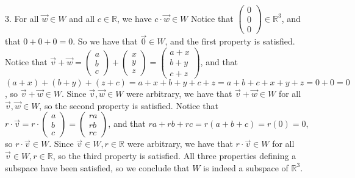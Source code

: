\documentclass[12pt]{article}
\newenvironment{problem}[2][Problem]
{
	\begin{trivlist} 
		\item[\hskip \labelsep {\bfseries #1 #2:}]
	}
{
	\end{trivlist}
	}
\newenvironment{solution}[1][Solution]
{
	\begin{trivlist} 
		\item[\hskip \labelsep {\itshape #1:}]
	}
	{
	\end{trivlist}
}
\begin{document}
\begin{problem}{5}
\begin{solution}
3. For all $\vec{w} \in W$ and all $c \in \mathbb{R}$, we have $c\cdot \vec{w} \in W$
\newline
\newline
\noindent
Notice that $\begin{pmatrix} 0\\0\\0 \end{pmatrix} \in \mathbb{R}^3$, and that $0+0+0 =0$. So we have that $\vec{0}\in W$, and the first property is satisfied.
\newline
\newline
\noindent
Notice that $\vec{v} +\vec{w} = \begin{pmatrix} a\\b\\c \end{pmatrix} + \begin{pmatrix}x\\y\\z\end{pmatrix} = \begin{pmatrix}a+x\\b+y\\c+z\end{pmatrix}$, and that $(a+x)+(b+y)+(z+c) = a+x+b+y+c+z=a+b+c+x+y+z=0+0=0$, so $\vec{v} + \vec{w} \in W$. Since $\vec{v},\vec{w} \in W$ were arbitrary, we have that $\vec{v} + \vec{w} \in W$ for all $\vec{v},\vec{w} \in W$, so the second property is satisfied.
\newline
\newline
\noindent
Notice that $r\cdot \vec{v} = r\cdot \begin{pmatrix} a\\b\\c \end{pmatrix} = \begin{pmatrix} ra\\rb\\rc \end{pmatrix}$, and that $ra + rb + rc  = r(a+b+c) = r(0) = 0$, so $r\cdot \vec{v} \in W$. Since $\vec{v} \in W, r\in \mathbb{R}$ were arbitrary, we have that $r\cdot \vec{v} \in W$ for all $\vec{v} \in W, r\in \mathbb{R}$, so the third property is satisfied.
\newline
\newline
\noindent
All three properties defining a subspace have been satisfied, so we conclude that $W$ is indeed a subspace of $\mathbb{R}^3$.
\end{solution}
\end{problem}
\end{document}
